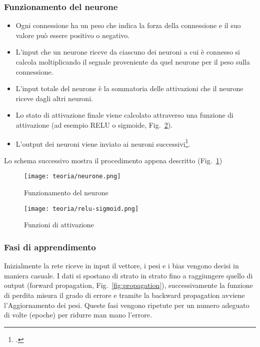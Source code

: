 \subsubsection{Funzionamento del neurone}

\begin{itemize}
    \item Ogni connessione ha un peso che indica la forza della connessione e il suo valore può essere positivo o negativo.
    \item L'input che un neurone riceve da ciascuno dei neuroni a cui è connesso si calcola moltiplicando il segnale proveniente da quel neurone per il peso sulla connessione.
    \item L'input totale del neurone è la sommatoria delle attivazioni che il neurone riceve dagli altri neuroni.
    \item Lo stato di attivazione finale viene calcolato attraverso una funzione di attivazione (ad esempio RELU o sigmoide, Fig.~\ref{fig:relu-sigmoid}).
    \item L'output dei neuroni viene inviato ai neuroni successivi\footcite{LectureA}.
\end{itemize}
Lo schema successivo mostra il procedimento appena descritto (Fig.~\ref{fig:neurone})

\begin{figure}[!h] 
    \centering 
    \texttt{[image: teoria/neurone.png]} 
    \caption{Funzionamento del neurone}
    \label{fig:neurone}
  \end{figure}

  \begin{figure}[!h] 
    \centering 
    \texttt{[image: teoria/relu-sigmoid.png]} 
    \caption{Funzioni di attivazione}
    \label{fig:relu-sigmoid}
  \end{figure}

\newpage

\subsubsection{Fasi di apprendimento} 
Inizialmente la rete riceve in input il vettore, i pesi e i bias vengono decisi in maniera casuale.
I dati si spostano di strato in strato fino a raggiungere quello di output (forward propagation, Fig.~\ref{fig:propagation}), successivamente la funzione di perdita misura il grado di errore e tramite la backward propagation avviene l'Aggiornamento dei pesi.
Queste fasi vengono ripetute per un numero adeguato di volte (epoche) per ridurre man mano l'errore.


